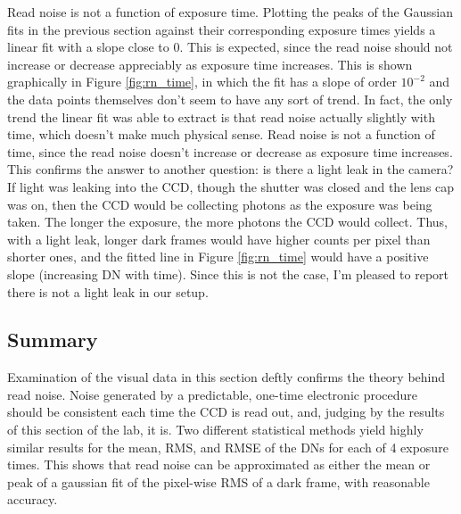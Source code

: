 \documentclass{aastex6}
\begin{document}
    Read noise is not a function of exposure time. Plotting the peaks of the Gaussian fits in the previous section against their corresponding exposure times yields a linear fit with a slope close to 0. This is expected, since the read noise should not increase or decrease appreciably as exposure time increases. This is shown graphically in Figure \ref{fig:rn_time}, in which the fit has a slope of order $ 10^{-2} $ and the data points themselves don't seem to have any sort of trend. In fact, the only trend the linear fit was able to extract is that read noise actually  slightly with time, which doesn't make much physical sense. Read noise is not a function of time, since the read noise doesn't increase or decrease as exposure time increases. This confirms the answer to another question: is there a light leak in the camera? If light was leaking into the CCD, though the shutter was closed and the lens cap was on, then the CCD would be collecting photons as the exposure was being taken. The longer the exposure, the more photons the CCD would collect. Thus, with a light leak, longer dark frames would have higher counts per pixel than shorter ones, and the fitted line in Figure \ref{fig:rn_time} would have a positive slope (increasing DN with time). Since this is not the case, I'm pleased to report there is not a light leak in our setup.

\subsection{Summary}

    Examination of the visual data in this section deftly confirms the theory behind read noise. Noise generated by a predictable, one-time electronic procedure should be consistent each time the CCD is read out, and, judging by the results of this section of the lab, it is. Two different statistical methods yield highly similar results for the mean, RMS, and RMSE of the DNs for each of 4 exposure times. This shows that read noise can be approximated as either the mean or peak of a gaussian fit of the pixel-wise RMS of a dark frame, with reasonable accuracy.
\end{document}
